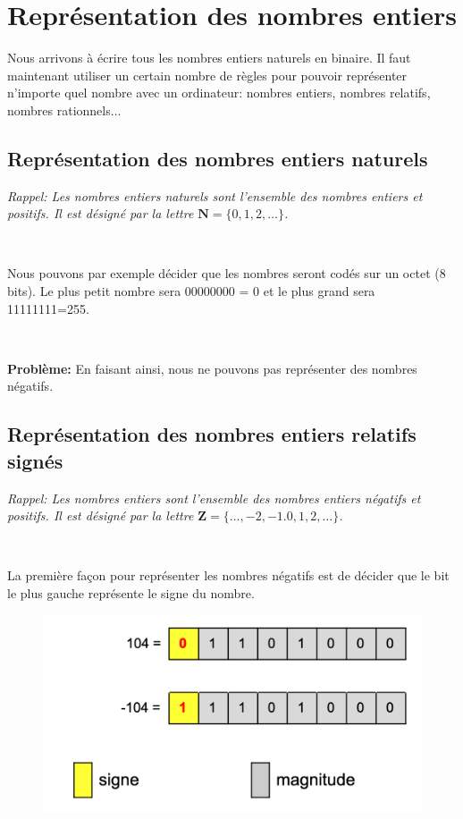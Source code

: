 \documentclass[11pt, a4paper]{book}
\begin{document}
\section{Représentation des nombres entiers}

Nous arrivons à écrire tous les nombres entiers naturels en binaire.  Il faut maintenant utiliser un certain nombre de règles pour pouvoir représenter n'importe quel nombre avec un ordinateur: nombres entiers, nombres relatifs, nombres rationnels...

\subsection{Représentation des nombres entiers naturels}

{\it Rappel: Les nombres entiers naturels sont l'ensemble des nombres entiers et positifs. Il est désigné par la lettre $\mathbf{N}=\{0,1,2,\ldots\}$.}

\ 

Nous pouvons par exemple décider que les nombres seront codés sur un octet (8 bits). Le plus petit nombre sera 00000000 = 0 et le plus grand sera 11111111=255.

\, 

{\bf Problème:} En faisant ainsi, nous ne pouvons pas représenter des nombres négatifs.

\subsection{Représentation des nombres entiers relatifs signés}

{\it Rappel: Les nombres entiers  sont l'ensemble des nombres entiers négatifs et positifs. Il est désigné par la lettre $\mathbf{Z}=\{\ldots,-2,-1.0,1,2,\ldots\}$.}

\ 

La première façon pour représenter les nombres négatifs est de décider que le bit le plus gauche représente le signe du nombre.

\begin{figure}[h]
\begin{center}
\includegraphics[scale=.5]{images/nombresigne}
\end{center}
\end{figure}
\end{document}
